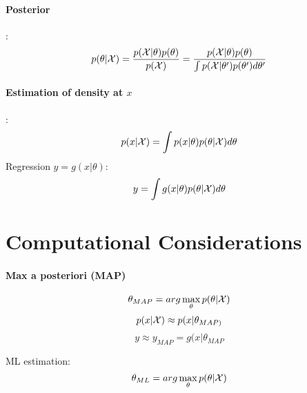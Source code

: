 \paragraph{Posterior}: 
    \[p(\theta|\mathcal{X}) = \frac{p(\mathcal{X}|\theta)p(\theta)}{p(\mathcal{X})} =
    \frac{p(\mathcal{X}|\theta)p(\theta)}{ \int
    p(\mathcal{X}|\theta')p(\theta')d\theta'}\]
    \paragraph{Estimation of density at $x$}: 
    \[p(x|\mathcal{X}) = \int p(x|\theta)p(\theta|\mathcal{X})d\theta\]
    Regression $y = g(x|\theta)$:
    \[ y = \int g(x|\theta)p(\theta|\mathcal{X})d\theta \]
\section{Computational Considerations}
\paragraph{Max a posteriori (MAP)}
\[\theta_{MAP}=arg\max_{\theta}p(\theta|\mathcal{X})\]
\[p(x|\mathcal{X}) \approx p(x|\theta_{MAP)}\] \[y\approx y_{MAP} =
    g(x|\theta_{MAP}\]

    ML estimation: \[\theta_{ML} = arg \max_{\theta} p(\theta|\mathcal{X})\]

